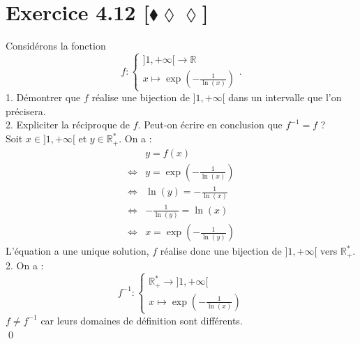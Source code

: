 \documentclass[10pt]{article}
\begin{document}
\section*{Exercice 4.12 [$\blacklozenge\lozenge\lozenge$]}
\begin{tcolorbox}[enhanced, width=7in, center, size=fbox, fontupper=\large, drop shadow southwest]
    Considérons la fonction
    \begin{equation*}
        f:\begin{cases}\rbrack1,+\infty\lbrack\rightarrow\mathbb{R}\\x\mapsto\exp(-\frac{1}{\ln(x)})\end{cases}.
    \end{equation*}
    1. Démontrer que $f$ réalise une bijection de $\rbrack1,+\infty\lbrack$ dans un intervalle que l'on précisera.\\
    2. Expliciter la réciproque de $f$. Peut-on écrire en conclusion que $f^{-1}=f$ ?\\[0.25cm]
    Soit $x\in\rbrack1,+\infty\lbrack$ et $y\in\mathbb{R}^*_+$. On a :
    \begin{align*}
        &y=f(x)\\
        \iff& y=\exp(-\frac{1}{\ln(x)})\\
        \iff& \ln(y)=-\frac{1}{\ln(x)}\\
        \iff& -\frac{1}{\ln(y)}=\ln(x)\\
        \iff& x=\exp(-\frac{1}{\ln(y)})
    \end{align*}
    L'équation a une unique solution, $f$ réalise donc une bijection de $\rbrack1,+\infty\lbrack$ vers $\mathbb{R}^*_+$.\\
    2. On a :
    \begin{equation*}
        f^{-1}:\begin{cases}\mathbb{R}^*_+\rightarrow\rbrack1,+\infty\lbrack\\x\mapsto\exp(-\frac{1}{\ln(x)})\end{cases}
    \end{equation*}
    $f\neq f^{-1}$ car leurs domaines de définition sont différents.\\
    \qed
\end{tcolorbox}
\end{document}
